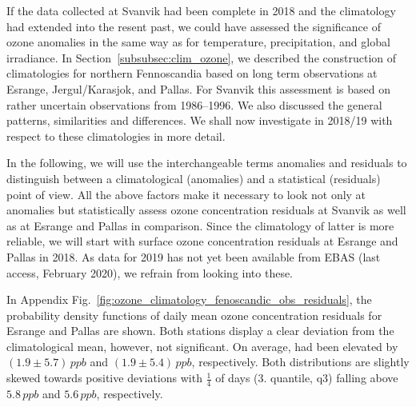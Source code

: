 \documentclass[bg, manuscript]{copernicus}
\begin{document}
If the data collected at Svanvik had been complete in 2018 and the climatology had extended into the resent past, we could have assessed the significance of ozone anomalies in the same way as for temperature, precipitation, and global irradiance. In Section~\ref{subsubsec:clim_ozone}, we described the construction of climatologies for northern Fennoscandia based on long term observations at Esrange, Jergul/Karasjok, and Pallas. For Svanvik this assessment is based on rather uncertain observations from 1986--1996. We also discussed the general patterns, similarities and differences. We shall now investigate \chem{\Delta[O_3]} in 2018/19 with respect to these climatologies in more detail.

In the following, we will use the interchangeable terms anomalies and residuals to distinguish between a climatological (anomalies) and a statistical (residuals) point of view.
All the above factors make it necessary to look not only at anomalies but statistically assess ozone concentration residuals at Svanvik as well as at Esrange and Pallas in comparison. Since the climatology of latter is more reliable, we will start with surface ozone concentration residuals \chem{\Delta[O_3]} at Esrange and Pallas in 2018. As data for 2019 has not yet been available from EBAS (last access, February 2020), we refrain from looking into these.

In Appendix Fig.~\ref{fig:ozone_climatology_fenoscandic_obs_residuals}, the probability density functions of daily mean ozone concentration residuals for Esrange and Pallas are shown. Both stations display a clear deviation from the climatological mean, however, not significant. On average, \chem{[O_3]} had been elevated by $(1.9\pm 5.7)\,\unit{ppb}$ and $(1.9\pm 5.4)\,\unit{ppb}$, respectively. Both distributions are slightly skewed towards positive deviations with $\frac{1}{4}$ of days (3. quantile, q3) falling above $5.8\,\unit{ppb}$ and $5.6\,\unit{ppb}$, respectively.
\end{document}
